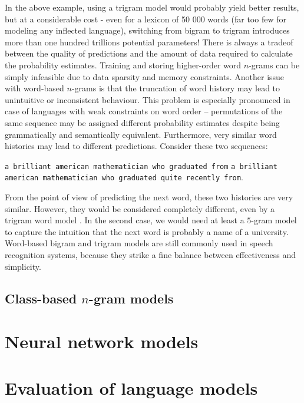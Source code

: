 In the above example, using a trigram model would probably yield better results, but at a considerable cost - even for a lexicon of 50 000 words (far too few for modeling any inflected language), switching from bigram to trigram introduces more than one hundred trillions potential parameters! There is always a tradeof between the quality of predictions and the amount of data required to calculate the probability estimates. Training and storing higher-order word $n$-grams can be simply infeasible due to data sparsity and memory constraints.
Another issue with word-based $n$-grams is that the truncation of word history may lead to unintuitive or inconsistent behaviour. This problem is especially pronounced in case of languages with weak constraints on word order -- permutations of the same sequence may be assigned different probability estimates despite being grammatically and semantically equivalent. Furthermore, very similar word histories may lead to different predictions. Consider these two sequences:
\begin{center}
	\texttt{a brilliant american mathematician who graduated from}
	\texttt{a brilliant american mathematician who graduated quite recently from}.
\end{center}
From the point of view of predicting the next word, these two histories are very similar. However, they would be considered completely different, even by a trigram word model \cite{whittaker2000statistical}. In the second case, we would need at least a $5$-gram model to capture the intuition that the next word is probably a name of a university.
Word-based bigram and trigram models are still commonly used in speech recognition systems, because they strike a fine balance between effectiveness and simplicity.
\subsection{Class-based $n$-gram models}
\section{Neural network models}
\label{section:ann}
\section{Evaluation of language models}
\label{section:evaluation}


